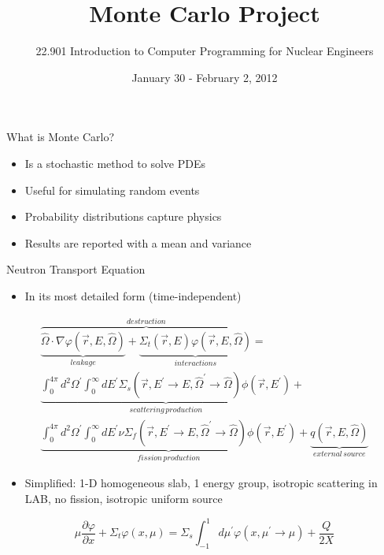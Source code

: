 \documentclass{beamer}
\title[]{Monte Carlo Project}
\author[]{22.901 Introduction to Computer Programming for Nuclear Engineers}
\institute[\insertpagenumber]{}
\date{January 30 - February 2, 2012}
\begin{document}

\frame{\titlepage}

\begin{frame}{What is Monte Carlo?}

  \begin{itemize}
    \item Is a stochastic method to solve PDEs
    \vfill\item Useful for simulating random events
    \vfill\item Probability distributions capture physics
    \vfill\item Results are reported with a mean and variance
  \end{itemize}

\end{frame}
\begin{frame}{Neutron Transport Equation}
  \scriptsize
  \begin{itemize}
    \item In its most detailed form (time-independent)
  \end{itemize}
  \vfill
\begin{multline*}
\overbrace{\underbrace{\hat{\Omega}\cdot\nabla\varphi\left(\vec{r},E,\hat{\Omega}\right)}_{leakage}+\underbrace{\Sigma_{t}\left(\vec{r},E\right)\varphi\left(\vec{r},E,\hat{\Omega}\right)}_{interactions}}^{destruction}=\\
\underbrace{\int_{0}^{4\pi}d^{2}\Omega^{\prime}\int_{0}^{\infty}dE^{\prime}\Sigma_{s}\left(\vec{r},E^{\prime}\rightarrow E,\hat{\Omega}^{\prime}\rightarrow\hat{\Omega}\right)\phi\left(\vec{r},E^{\prime}\right)}_{scattering\, production}+\\
\underbrace{\int_{0}^{4\pi}d^{2}\Omega^{\prime}\int_{0}^{\infty}dE^{\prime}\nu\Sigma_{f}\left(\vec{r},E^{\prime}\rightarrow E,\hat{\Omega}^{\prime}\rightarrow\hat{\Omega}\right)\phi\left(\vec{r},E^{\prime}\right)}_{fission\, production}+\underbrace{q\left(\vec{r},E,\hat{\Omega}\right)}_{external\, source}
\end{multline*}
  \vfill
  \begin{itemize}
    \item Simplified: 1-D homogeneous slab, 1 energy group, isotropic scattering in LAB, no fission, isotropic uniform source
  \end{itemize}
  \vfill
\[
\mu\frac{\partial\varphi}{\partial x}+\Sigma_{t}\varphi\left(x,\mu\right)=\Sigma_{s}\int_{-1}^{1}d\mu^{\prime}\varphi\left(x,\mu^{\prime}\rightarrow\mu\right)+\frac{Q}{2X} 
\]
\end{frame}
\end{document}
